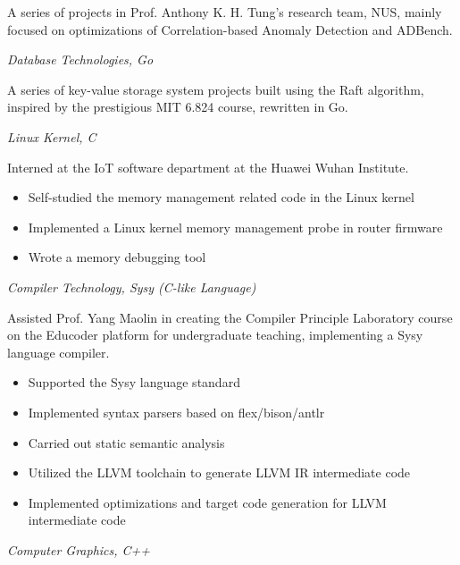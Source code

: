 \documentclass{uniquecv}
\begin{document}
A series of projects in Prof. Anthony K. H. Tung's research team, NUS, mainly focused on optimizations of Correlation-based Anomaly Detection and ADBench.




\textit{Database Technologies, Go}
\vspace{0.4ex}

A series of key-value storage system projects built using the Raft algorithm, inspired by the prestigious MIT 6.824 course, rewritten in Go.



\textit{Linux Kernel, C}
\vspace{0.4ex}

Interned at the IoT software department at the Huawei Wuhan Institute.
\begin{itemize}
    \item Self-studied the memory management related code in the Linux kernel
    \item Implemented a Linux kernel memory management probe in router firmware
    \item Wrote a memory debugging tool
\end{itemize}

\textit{Compiler Technology, Sysy (C-like Language)}
\vspace{0.4ex}

Assisted Prof. Yang Maolin in creating the Compiler Principle Laboratory course on the Educoder platform for undergraduate teaching, implementing a Sysy language compiler.
\begin{itemize}
  \item Supported the Sysy language standard
  \item Implemented syntax parsers based on flex/bison/antlr
  \item Carried out static semantic analysis
  \item Utilized the LLVM toolchain to generate LLVM IR intermediate code
  \item Implemented optimizations and target code generation for LLVM intermediate code
\end{itemize}

\textit{Computer Graphics, C++}
\vspace{0.4ex}
\end{document}
